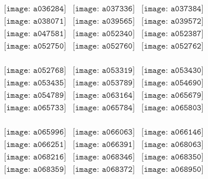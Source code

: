 \documentclass{article}
\begin{document}
\begin{figure}[H]
 \begin{center}$
 \begin{array}{cccc}
\texttt{[image: a036284]}&\texttt{[image: a037336]}&\texttt{[image: a037384]}\\\texttt{[image: a038071]}&\texttt{[image: a039565]}&\texttt{[image: a039572]}\\\texttt{[image: a047581]}&\texttt{[image: a052340]}&\texttt{[image: a052387]}\\\texttt{[image: a052750]}&\texttt{[image: a052760]}&\texttt{[image: a052762]}\\
\end{array}$
\end{center}
\end{figure}

\begin{figure}[H]
 \begin{center}$
 \begin{array}{cccc}
\texttt{[image: a052768]}&\texttt{[image: a053319]}&\texttt{[image: a053430]}\\\texttt{[image: a053435]}&\texttt{[image: a053789]}&\texttt{[image: a054690]}\\\texttt{[image: a054789]}&\texttt{[image: a063164]}&\texttt{[image: a065679]}\\\texttt{[image: a065733]}&\texttt{[image: a065784]}&\texttt{[image: a065803]}\\
\end{array}$
\end{center}
\end{figure}

\begin{figure}[H]
 \begin{center}$
 \begin{array}{cccc}
\texttt{[image: a065996]}&\texttt{[image: a066063]}&\texttt{[image: a066146]}\\\texttt{[image: a066251]}&\texttt{[image: a066391]}&\texttt{[image: a068063]}\\\texttt{[image: a068216]}&\texttt{[image: a068346]}&\texttt{[image: a068350]}\\\texttt{[image: a068359]}&\texttt{[image: a068372]}&\texttt{[image: a068950]}\\
\end{array}$
\end{center}
\end{figure}
\end{document}

